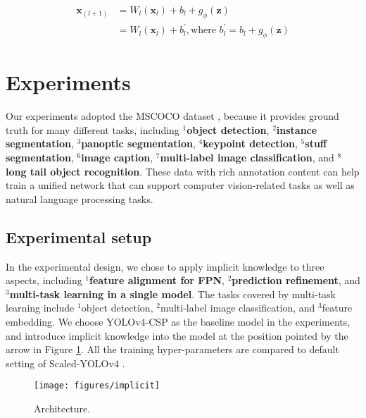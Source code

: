 \documentclass[10pt,twocolumn,letterpaper]{article}
\begin{document}
 \begin{equation}
 \begin{split}
 \mathbf{x}_{(l+1)} & = W_{l}(\mathbf{x}_{l}) + b_{l} +g_{\phi}(\mathbf{z}) \\
 & = W_{l}(\mathbf{x}_{l}) + b_{l}^{'}, \text{where } b_{l}^{'} = b_{l} + g_{\phi}(\mathbf{z})
 \end{split}
 \label{eq:ia}
 \end{equation}
 
 \newpage

\section{Experiments}

Our experiments adopted the MSCOCO dataset \cite{lin2014microsoft}, because it provides ground truth for many different tasks, including \textbf{$^{1}$object detection}, \textbf{$^{2}$instance segmentation}, \textbf{$^{3}$panoptic segmentation}, \textbf{$^{4}$keypoint detection}, \textbf{$^{5}$stuff segmentation}, \textbf{$^{6}$image caption}, \textbf{$^{7}$multi-label image classification}, and \textbf{$^{8}$long tail object recognition}. These data with rich annotation content can help train a unified network that can support computer vision-related tasks as well as natural language processing tasks.

\subsection{Experimental setup}

In the experimental design, we chose to apply implicit knowledge to three aspects, including \textbf{$^{1}$feature alignment for FPN}, \textbf{$^{2}$prediction refinement}, and \textbf{$^{3}$multi-task learning in a single model}. The tasks covered by multi-task learning include $^{1}$object detection, $^{2}$multi-label image classification, and $^{3}$feature embedding. We choose YOLOv4-CSP \cite{wang2020scaled} as the baseline model in the experiments, and introduce implicit knowledge into the model at the position pointed by the arrow in Figure \ref{fig:imp}. All the training hyper-parameters are compared to default setting of Scaled-YOLOv4 \cite{wang2020scaled}.

\begin{figure}[h]
	\begin{center}
		\texttt{[image: figures/implicit]}
	\end{center}
	\caption{Architecture.}
	\label{fig:imp}
\end{figure}
\end{document}
